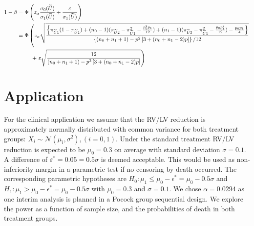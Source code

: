\documentclass[bimj,fleqn]{w-art}\usepackage[]{graphicx}\usepackage[]{color}
\theoremstyle{plain}
\theoremstyle{definition}
\begin{document}
  \begin{align*}
	  1 - \beta &= \Phi\left(z_{\alpha}\frac{\sigma_0(\widetilde{U})}{\sigma_1(\widetilde{U})} +
                            \frac{\varepsilon}{\sigma_1(\widetilde{U})} \right) \\
							&= \Phi\left(z_{\alpha}
							   \sqrt\frac{
								 \left\{ \pi_{\widetilde{U}1} (1 - \pi_{\widetilde{U}1})
								       + (n_0 - 1)( \pi_{\widetilde{U}2} - \pi^2_{\widetilde{U}1} - \frac{p_0^2 p_1}{12})
											 + (n_1 - 1)( \pi_{\widetilde{U}3} - \pi^2_{\widetilde{U}1} - \frac{p_0 p_1^2}{12})
											 - \frac{p_0 p_1}{4}
								\right\}}{\left\{ (n_0 + n_1 +1) -
                p^2 \left[ 3 +(n_0 + n_1 -2) p \right] \right\} / 12 } \right. \\
							&{\hphantom{= \Phi\bigg(}} + \left.
							  \varepsilon \sqrt\frac{12}{(n_0 + n_1 +1) -
                p^2 \left[ 3 +(n_0 + n_1 -2) p \right]} \right)
  \end{align*}


  \section{Application}
  \label{sec:Application}
	For the clinical application we assume that the RV/LV reduction is approximately normally distributed
	with common variance for both treatment groups:
	$X_i \sim \mathcal{N} ( \mu_i, \sigma^2 ), (i = 0, 1)$. Under the standard treatment RV/LV reduction
	is expected to be $\mu_0 = 0.3$ on average with standard deviation $\sigma= 0.1$. A difference of
	$\varepsilon^{*} = 0.05 = 0.5 \sigma$ is deemed acceptable. This would be used as non-inferiority
	margin in a parametric test if no censoring by death occurred. The corresponding parametric hypotheses
	are $H_0: \mu_1 \leq \mu_0 - \epsilon^{*}  = \mu_0 - 0.5 \sigma $ and
	$H_1: \mu_1 > \mu_0 - \epsilon^{*} = \mu_0 - 0.5 \sigma $ with $\mu_0 = 0.3$ and $\sigma = 0.1$.
	We chose $\alpha = 0.0294$ as one interim analysis is planned in a Pocock group sequential design.
  We explore the power as a function of sample size, and the probabilities of death in both treatment
	groups.
\end{document}
